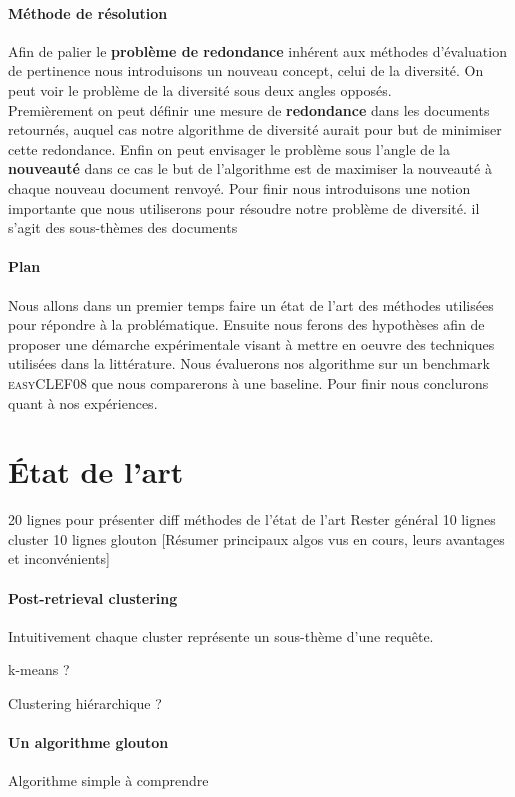 \documentclass{article}
\begin{document}
\paragraph{Méthode de résolution}
Afin de palier le \textbf{problème de redondance} inhérent aux méthodes d'évaluation de pertinence nous introduisons un nouveau concept, celui de la diversité. On peut voir le problème de la diversité sous deux angles opposés. \\
Premièrement on peut définir une mesure de \textbf{redondance} dans les documents retournés, auquel cas notre algorithme de diversité aurait pour but de minimiser cette redondance. Enfin on peut envisager le problème sous l'angle de la \textbf{nouveauté} dans ce cas le but de l'algorithme est de maximiser la nouveauté à chaque nouveau document renvoyé. Pour finir nous introduisons une notion importante que nous utiliserons pour résoudre notre problème de diversité. il s'agit des sous-thèmes des documents

\paragraph{Plan}
Nous allons dans un premier temps faire un état de l'art des méthodes utilisées pour répondre à la problématique. Ensuite nous ferons des hypothèses afin de proposer une démarche expérimentale visant à mettre en oeuvre des techniques utilisées dans la littérature. Nous évaluerons nos algorithme sur un benchmark \textsc{easyCLEF08} que nous comparerons à une baseline. Pour finir nous conclurons quant à nos expériences.

\section{État de l'art}
20 lignes pour présenter diff méthodes de l'état de l'art
Rester général
10 lignes cluster
10 lignes glouton
[Résumer principaux algos vus en cours, leurs avantages et inconvénients]
\paragraph{Post-retrieval clustering}
Intuitivement chaque cluster représente un sous-thème d'une requête.

k-means ?

Clustering hiérarchique ?


\paragraph{Un algorithme glouton}
Algorithme simple à comprendre
\end{document}
